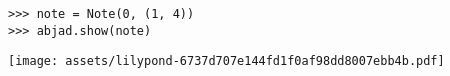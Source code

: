 \begin{comment}
<abjad>
note = Note(0, (1, 4))
abjad.show(note)
</abjad>
\end{comment}

\begin{lstlisting}
>>> note = Note(0, (1, 4))
>>> abjad.show(note)
\end{lstlisting}
\noindent\texttt{[image: assets/lilypond-6737d707e144fd1f0af98dd8007ebb4b.pdf]}
